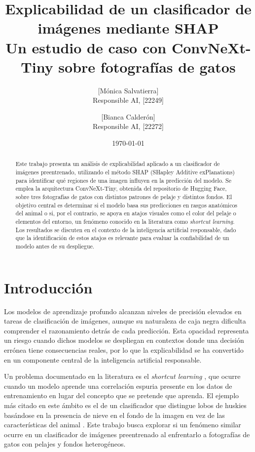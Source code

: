 \documentclass[11pt]{article}
\title{Explicabilidad de un clasificador de imágenes mediante SHAP\\
\large Un estudio de caso con ConvNeXt-Tiny sobre fotografías de gatos}
\author{
  [Mónica Salvatierra] \\{} Responsible AI, [22249] \\{}
  \and
  [Bianca Calderón] \\{} Responsible AI, [22272] \\{}
}
\date{\today}
\begin{document}
\maketitle

\begin{abstract}
Este trabajo presenta un análisis de explicabilidad aplicado a un clasificador de imágenes preentrenado, utilizando el método SHAP (SHapley Additive exPlanations) para identificar qué regiones de una imagen influyen en la predicción del modelo. Se emplea la arquitectura ConvNeXt-Tiny, obtenida del repositorio de Hugging Face, sobre tres fotografías de gatos con distintos patrones de pelaje y distintos fondos. El objetivo central es determinar si el modelo basa sus predicciones en rasgos anatómicos del animal o si, por el contrario, se apoya en atajos visuales como el color del pelaje o elementos del entorno, un fenómeno conocido en la literatura como \emph{shortcut learning}. Los resultados se discuten en el contexto de la inteligencia artificial responsable, dado que la identificación de estos atajos es relevante para evaluar la confiabilidad de un modelo antes de su despliegue.
\end{abstract}

\section{Introducción}

Los modelos de aprendizaje profundo alcanzan niveles de precisión elevados en tareas de clasificación de imágenes, aunque su naturaleza de caja negra dificulta comprender el razonamiento detrás de cada predicción. Esta opacidad representa un riesgo cuando dichos modelos se despliegan en contextos donde una decisión errónea tiene consecuencias reales, por lo que la explicabilidad se ha convertido en un componente central de la inteligencia artificial responsable.

Un problema documentado en la literatura es el \emph{shortcut learning} \citep{geirhos2020shortcut}, que ocurre cuando un modelo aprende una correlación espuria presente en los datos de entrenamiento en lugar del concepto que se pretende que aprenda. El ejemplo más citado en este ámbito es el de un clasificador que distingue lobos de huskies basándose en la presencia de nieve en el fondo de la imagen en vez de las características del animal \citep{ribeiro2016why}. Este trabajo busca explorar si un fenómeno similar ocurre en un clasificador de imágenes preentrenado al enfrentarlo a fotografías de gatos con pelajes y fondos heterogéneos.
\end{document}
